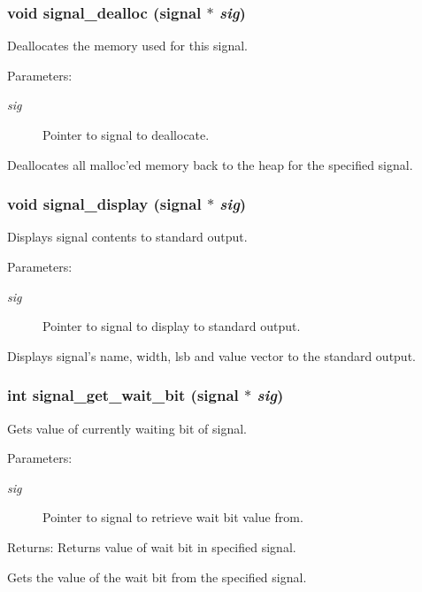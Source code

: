 \subsubsection{\setlength{\rightskip}{0pt plus 5cm}void signal\_\-dealloc ({\bf signal} $\ast$ {\em sig})}\label{signal_8h_a10}


Deallocates the memory used for this signal. 

\begin{Desc}
\item[Parameters:]
\begin{description}
\item[{\em sig}]Pointer to signal to deallocate.\end{description}
\end{Desc}
Deallocates all malloc'ed memory back to the heap for the specified signal. 
\subsubsection{\setlength{\rightskip}{0pt plus 5cm}void signal\_\-display ({\bf signal} $\ast$ {\em sig})}\label{signal_8h_a9}


Displays signal contents to standard output. 

\begin{Desc}
\item[Parameters:]
\begin{description}
\item[{\em sig}]Pointer to signal to display to standard output.\end{description}
\end{Desc}
Displays signal's name, width, lsb and value vector to the standard output. 
\subsubsection{\setlength{\rightskip}{0pt plus 5cm}int signal\_\-get\_\-wait\_\-bit ({\bf signal} $\ast$ {\em sig})}\label{signal_8h_a6}


Gets value of currently waiting bit of signal. 

\begin{Desc}
\item[Parameters:]
\begin{description}
\item[{\em sig}]Pointer to signal to retrieve wait bit value from.\end{description}
\end{Desc}
\begin{Desc}
\item[Returns:]Returns value of wait bit in specified signal.\end{Desc}
Gets the value of the wait bit from the specified signal. 
